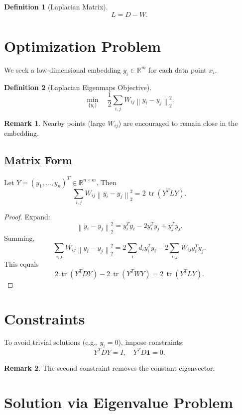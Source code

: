 \documentclass[12pt,oneside]{book}
\numberwithin{equation}{section}
\theoremstyle{definition}
\newtheorem{definition}{Definition}[section]
\newtheorem{remark}{Remark}[section]
\theoremstyle{plain}
\theoremstyle{remark}
\newcommand{\R}{\mathbb{R}}
\newcommand{\norm}[1]{\left\lVert #1 \right\rVert}
\newcommand{\tr}{\operatorname{tr}}
\begin{document}
\begin{definition}[Laplacian Matrix]
\[
L = D - W.
\]
\end{definition}

\section{Optimization Problem}

We seek a low-dimensional embedding $y_i \in \R^m$ for each data point $x_i$.

\begin{definition}[Laplacian Eigenmaps Objective]
\[
\min_{\{y_i\}}
\quad
\frac{1}{2}
\sum_{i,j} W_{ij} \norm{y_i - y_j}_2^2.
\]
\end{definition}

\begin{remark}
Nearby points (large $W_{ij}$) are encouraged to remain close in the embedding.
\end{remark}

\subsection{Matrix Form}

Let $Y = (y_1,\dots,y_n)^T \in \R^{n \times m}$. Then
\[
\sum_{i,j} W_{ij} \norm{y_i - y_j}_2^2
=
2 \, \tr(Y^T L Y).
\]

\begin{proof}
Expand:
\[
\norm{y_i - y_j}_2^2
=
y_i^T y_i - 2 y_i^T y_j + y_j^T y_j.
\]
Summing,
\[
\sum_{i,j} W_{ij} \norm{y_i - y_j}_2^2
=
2 \sum_i d_i y_i^T y_i - 2 \sum_{i,j} W_{ij} y_i^T y_j.
\]
This equals
\[
2 \, \tr(Y^T D Y) - 2 \, \tr(Y^T W Y)
=
2 \, \tr(Y^T L Y).
\]
\end{proof}

\section{Constraints}

To avoid trivial solutions (e.g., $y_i=0$), impose constraints:
\[
Y^T D Y = I,
\quad
Y^T D \mathbf{1} = 0.
\]

\begin{remark}
The second constraint removes the constant eigenvector.
\end{remark}

\section{Solution via Eigenvalue Problem}
\end{document}
